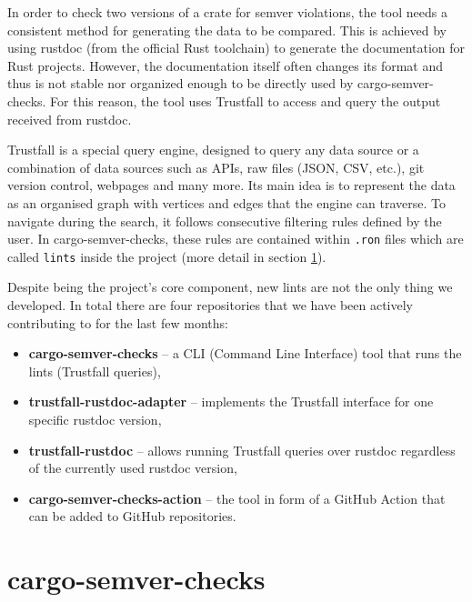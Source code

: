 \documentclass[licencjacka,en]{pracamgr}
\begin{document}
In order to check two versions of a crate for semver violations, the tool needs a consistent method
for generating the data to be compared. This is achieved by using rustdoc (from the official
Rust toolchain) to generate the documentation for Rust projects. However, the documentation itself
often changes its format and thus is not stable nor organized enough to be directly used by
cargo-semver-checks. For this reason, the tool uses Trustfall to access and query the output
received from rustdoc.

Trustfall is a special query engine, designed to query any data source or a combination of data
sources such as APIs, raw files (JSON, CSV, etc.), git version control, webpages and many more.
Its main idea is to represent the data as an organised graph with vertices and edges that the
engine can traverse. To navigate during the search, it follows consecutive filtering rules defined
by the user. In cargo-semver-checks, these rules are contained within \texttt{.ron} files which
are called \texttt{lints} inside the project (more detail in section
\ref{r:section_cargo_semver_checks}).

Despite being the project's core component, new lints are not the only thing we developed. In total
there are four repositories that we have been actively contributing to for the last few months:
\begin{itemize}
	\item \textbf{cargo-semver-checks} -- a CLI (Command Line Interface) tool that runs the lints
		(Trustfall queries),
	\item \textbf{trustfall-rustdoc-adapter} -- implements the Trustfall interface for one specific
		rustdoc version,
	\item \textbf{trustfall-rustdoc} -- allows running Trustfall queries over rustdoc regardless of
		the currently used rustdoc version,
	\item \textbf{cargo-semver-checks-action} -- the tool in form of a GitHub Action that can
	    be added to GitHub repositories.
\end{itemize}

\section{cargo-semver-checks}\label{r:section_cargo_semver_checks}
\end{document}
